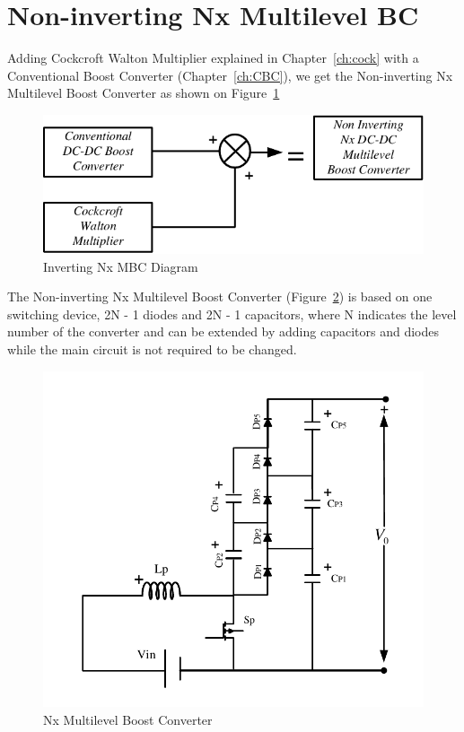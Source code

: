 \section{Non-inverting Nx Multilevel BC}\label{ch:MBC}


Adding Cockcroft Walton Multiplier explained in Chapter~\ref{ch:cock} with a Conventional Boost Converter (Chapter~\ref{ch:CBC}), we get the Non-inverting Nx Multilevel Boost Converter as shown on Figure~\ref{fig:MBC_CW_CBCtoNx}

\begin{figure}[H]
   \centering
   \includegraphics[width=\textwidth]{figures/yMultilevel/CW_CBCtoNx.pdf}
   \caption{Inverting Nx MBC Diagram}
	\label{fig:MBC_CW_CBCtoNx}
\end{figure}


The Non-inverting Nx Multilevel Boost Converter (Figure~\ref{fig:MBC_3XFULL}) is based on one switching device, 2N - 1 diodes and 2N - 1 capacitors, where N indicates the level number of the converter and can be extended by adding capacitors and diodes while the main circuit is not required to be changed. 

\begin{figure}[H]
   \centering
   \includegraphics[width=\textwidth]{figures/yMultilevel/3x_FULL.pdf}
    \caption{Nx Multilevel Boost Converter}
	\label{fig:MBC_3XFULL}
\end{figure}

